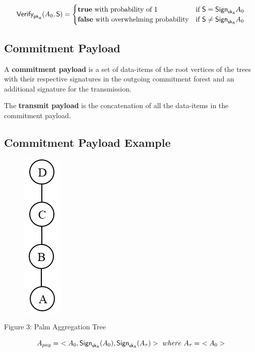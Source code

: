 \documentclass[%
  slidesonly,%
  semlayer%
  ]{seminar}                                  %
\newcommand{\sk}{\sf{sk}}
\newcommand{\pk}{\sf{pk}}
\begin{document}
\begin{slide}
      \begin{equation*}
        \textsf{Verify}_{\pk_{A}}(A_{0},\textsf{S}) = 
        \begin{cases}
         \textbf{true}\ \mbox{with probability of 1} & \mbox{if}\  \textsf{S} = \textsf{Sign}_{\sk_{A}}A_{0}\\
         \textbf{false}\ \mbox{with overwhelming probability} & \mbox{if}\  \textsf{S} \neq \textsf{Sign}_{\sk_{A}}A_{0}
        \end{cases}
      \end{equation*}
      \vfill
      \clearpage

    \subsection*{Commitment Payload}
      \vfill
      A \textbf{commitment payload} is a set of data-items of the root vertices of the trees with their respective signatures in the outgoing commitment forest and an additional signature for the transmission.
    
      The \textbf{transmit payload} is the concatenation of all the data-items in the commitment payload.
      \vfill
      \clearpage

    \subsection*{Commitment Payload Example}
      \vfill
      \begin{figure}[h!]
        \centering
        \includegraphics[scale = 0.4]{images/palm-aggregation-tree.png}
      \end{figure}
      \begin{center}
        Figure 3: Palm Aggregation Tree
      \end{center}
      \begin{equation*}
        A_{pay} =\ <A_{0}, \textsf{Sign}_{\sk_{A}}(A_{0}), \textsf{Sign}_{\sk_{A}}(A_{\tau}) >\ where\ A_{\tau} =\ < A_{0} > 
      \end{equation*}
      \vfill
      \clearpage


\end{slide}
\end{document}
